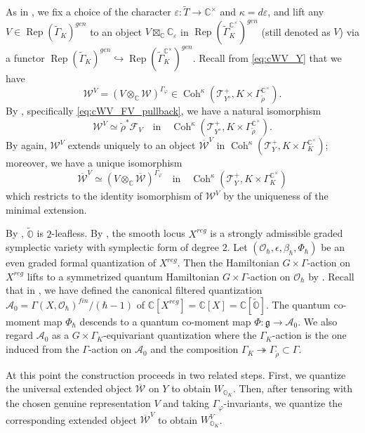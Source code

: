 \documentclass[11pt, a4paper]{amsart}
\newcommand{\C}{\mathbb{C}}
\newcommand{\g}{\mathfrak{g}}
\newcommand{\orb}{\mathbb{O}}
\newcommand{\orbk}{\orb_{K}}
\newcommand{\cA}{\mathcal{A}}
\newcommand{\cF}{\mathcal{F}}
\newcommand{\cW}{\mathcal{W}}
\newcommand{\hb}{\hbar}
\newcommand{\WV}{W^{\scriptscriptstyle V}}
\newcommand{\cWV}{\cW^{\scriptscriptstyle V}}
\newcommand{\cWVbar}{\overline{\cW}^{\scriptscriptstyle V}}
\newcommand{\tGamma}{\widetilde{\Gamma}}
\DeclareMathOperator{\Rep}{Rep}
\DeclareMathOperator{\Coh}{Coh}
\newcommand{\TT}{\mathscr{T}}
\newcommand{\cm}{\C^\times}
\newcommand{\OO}{\mathcal{O}}
\theoremstyle{definition}
\numberwithin{equation}{section}
\begin{document}
As in , we fix a choice of the character $\varepsilon: \widetilde{T} \to \cm$ and $\kappa = d\varepsilon$, and lift any $V \in \Rep(\tGamma_K)^{gen}$ to an object $V \boxtimes_\C \C_\varepsilon$ in $\Rep(\tGamma_K^{\cm})^{gen}$ (still denoted as $V$) via a functor $\Rep(\tGamma_K)^{gen} \hookrightarrow \Rep(\tGamma_K^{\cm})^{gen}$.
Recall from \eqref{eq:cWV_Y} that we have
\[
	\cWV = (V \otimes_\C \cW)^{\Gamma_\varphi} \in \Coh^\kappa(\TT^+_{Y^\diamond}, K \times \Gamma_{\tilde{\rho}}^{\cm}).
\]
By , specifically \eqref{eq:cWV_FV_pullback}, we have a natural isomorphism 
	\[\cWV \simeq \tilde{\rho}^* \cF_V \quad \text{in} \quad \Coh^\kappa(\TT^+_{Y^\diamond}, K \times \Gamma_{\tilde{\rho}}^{\cm}).\] 
By  again, $\cWV$ extends uniquely to an object $\cWVbar$ in $\Coh^\kappa(\TT^+_Y, K \times \Gamma_K^{\cm})$; moreover, we have a unique isomorphism
\begin{equation} \label{eq:isom_cWVbar_Wbar_inv}
	\cWVbar \simeq (V \otimes_\C \overline{\cW})^{\Gamma_\varphi} \quad \text{in} \quad \Coh^\kappa(\TT^+_Y, K \times \Gamma_K^{\cm})
\end{equation} 
which restricts to the identity isomorphism of $\cWV$ by the uniqueness of the minimal extension.

By , $\widetilde{\orb}$ is $2$-leafless. By , the smooth locus $X^{reg}$ is a strongly admissible graded symplectic variety with symplectic form of degree $2$. 
Let $(\OO_\hb, \epsilon, \beta_\hb, \Phi_\hb)$ be an even graded formal quantization of $X^{reg}$. Then the Hamiltonian $G \times \Gamma$-action on $X^{reg}$ lifts to a symmetrized quantum Hamiltonian $G \times \Gamma$-action on $\OO_\hb$ by . 
Recall that in , we have defined the canonical filtered quantization $\cA_0 = \Gamma(X, \OO_\hb)^{fin}/(\hb-1)$ of $\C[X^{reg}] = \C[X] = \C[\widetilde{\orb}]$. The quantum co-moment map $\Phi_\hb$ descends to a quantum co-moment map $\Phi: \g \to \cA_0$. We also regard $\cA_0$ as a $G \times \Gamma_K$-equivariant quantization where the $\Gamma_K$-action is the one induced from the $\Gamma$-action on $\cA_0$ and the composition $\Gamma_K \twoheadrightarrow \Gamma_{\tilde{\rho}} \subset \Gamma$.

At this point the construction proceeds in two related steps. First, we quantize the universal extended object $\overline{\cW}$ on $Y$ to obtain $W_{\orbk}$. Then, after tensoring with the chosen genuine representation $V$ and taking $\Gamma_\varphi$-invariants, we quantize the corresponding extended object $\cWVbar$ to obtain $\WV_{\orbk}$.
\end{document}
